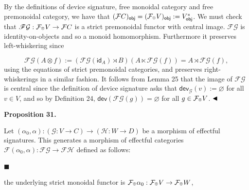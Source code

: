 By the definitions of device signature, free monoidal category and free premonoidal category, we have that $(\mathcal{F}C)_{\mathsf{obj}}=(\mathcal{F}_{\mathbin{\raisebox{1.25pt}{$\scriptscriptstyle\otimes$}}}V)_{\mathsf{obj}}:=V_{\mathsf{obj}}^{*}$. We must check that $\mathscr{F}{\mathcal{G}}:\mathcal{F}_{\mathbin{\raisebox{1.25pt}{$\scriptscriptstyle\otimes$}}}V\to\mathcal{F}C$ is a strict premonoidal functor with central image. $\mathscr{F}{\mathcal{G}}$ is identity-on-objects and so a monoid homomorphism. Furthermore it preserves left-whiskering since\par
    \[\mathscr{F}{\mathcal{G}}(A\otimes f):=(\mathscr{F}{\mathcal{G}}(\mathsf{id}_{A})\rtimes B)(A\ltimes\mathscr{F}{\mathcal{G}}(f))=A\rtimes\mathscr{F}{\mathcal{G}}(f),\]    
using the equations of strict premonoidal categories, and preserves right-whiskerings in a similar fashion. It follows from Lemma 25 that the image of $\mathscr{F}{\mathcal{G}}$ is central since the definition of device signature asks that $\mathsf{dev}_{\mathcal{G}}(v):=\varnothing$ for all $v\in V$, and so by Definition 24, $\mathsf{dev}(\mathscr{F}{\mathcal{G}}(g))=\varnothing$ for all $g\in\mathcal{F}_{\mathbin{\raisebox{1.25pt}{$\scriptscriptstyle\otimes$}}}V$. $\hfill\blacktriangleleft$\par
 
 
 
\par\medskip\noindent\textbf{Proposition 31.}\par
 
 
Let $(\alpha_{0},\alpha):(\mathcal{G}:V\to C)\to(\mathcal{H}:W\to D)$ be a morphism of effectful signatures. This generates a morphism of effectful categories $\mathscr{F}{(\alpha_{0},\alpha)}:\mathscr{F}{\mathcal{G}}\to\mathscr{F}{\mathcal{H}}$ defined as follows:\par
  
\par\noindent  $\blacksquare$ 
 
the underlying strict monoidal functor is $\mathcal{F}_{\mathbin{\raisebox{1.25pt}{$\scriptscriptstyle\otimes$}}}\alpha_{0}:\mathcal{F}_{\mathbin{\raisebox{1.25pt}{$\scriptscriptstyle\otimes$}}}V\to\mathcal{F}_{\mathbin{\raisebox{1.25pt}{$\scriptscriptstyle\otimes$}}}W$,\par
 
 
